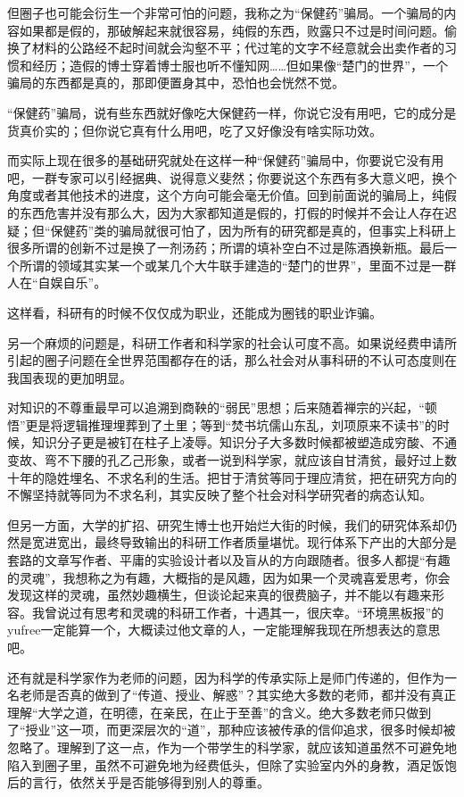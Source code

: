 \documentclass[
]{book}
\begin{document}
但圈子也可能会衍生一个非常可怕的问题，我称之为``保健药''骗局。一个骗局的内容如果都是假的，那破解起来就很容易，纯假的东西，败露只不过是时间问题。偷换了材料的公路经不起时间就会沟壑不平；代过笔的文字不经意就会出卖作者的习惯和经历；造假的博士穿着博士服也听不懂知网\ldots\ldots 但如果像``楚门的世界''，一个骗局的东西都是真的，那即便置身其中，恐怕也会恍然不觉。

``保健药''骗局，说有些东西就好像吃大保健药一样，你说它没有用吧，它的成分是货真价实的；但你说它真有什么用吧，吃了又好像没有啥实际功效。

而实际上现在很多的基础研究就处在这样一种``保健药''骗局中，你要说它没有用吧，一群专家可以引经据典、说得意义斐然；你要说这个东西有多大意义吧，换个角度或者其他技术的进度，这个方向可能会毫无价值。回到前面说的骗局上，纯假的东西危害并没有那么大，因为大家都知道是假的，打假的时候并不会让人存在迟疑；但``保健药''类的骗局就很可怕了，因为所有的研究都是真的，但事实上科研上很多所谓的创新不过是换了一剂汤药；所谓的填补空白不过是陈酒换新瓶。最后一个所谓的领域其实某一个或某几个大牛联手建造的``楚门的世界''，里面不过是一群人在``自娱自乐''。

这样看，科研有的时候不仅仅成为职业，还能成为圈钱的职业诈骗。

另一个麻烦的问题是，科研工作者和科学家的社会认可度不高。如果说经费申请所引起的圈子问题在全世界范围都存在的话，那么社会对从事科研的不认可态度则在我国表现的更加明显。

对知识的不尊重最早可以追溯到商鞅的``弱民''思想；后来随着禅宗的兴起，``顿悟''更是将逻辑推理埋葬到了土里；等到``焚书坑儒山东乱，刘项原来不读书''的时候，知识分子更是被钉在柱子上凌辱。知识分子大多数时候都被塑造成穷酸、不通变故、弯不下腰的孔乙己形象，或者一说到科学家，就应该自甘清贫，最好过上数十年的隐姓埋名、不求名利的生活。把甘于清贫等同于理应清贫，把在研究方向的不懈坚持就等同为不求名利，其实反映了整个社会对科学研究者的病态认知。

但另一方面，大学的扩招、研究生博士也开始烂大街的时候，我们的研究体系却仍然是宽进宽出，最终导致输出的科研工作者质量堪忧。现行体系下产出的大部分是套路的文章写作者、平庸的实验设计者以及盲从的方向跟随者。很多人都提``有趣的灵魂''，我想称之为有趣，大概指的是风趣，因为如果一个灵魂喜爱思考，你会发现这样的灵魂，虽然妙趣横生，但谈论起来真的很费脑子，并不能以有趣来形容。我曾说过有思考和灵魂的科研工作者，十遇其一，很庆幸。``环境黑板报''的yufree一定能算一个，大概读过他文章的人，一定能理解我现在所想表达的意思吧。

还有就是科学家作为老师的问题，因为科学的传承实际上是师门传递的，但作为一名老师是否真的做到了``传道、授业、解惑''？其实绝大多数的老师，都并没有真正理解``大学之道，在明德，在亲民，在止于至善''的含义。绝大多数老师只做到了``授业''这一项，而更深层次的``道''，那种应该被传承的信仰追求，很多时候却被忽略了。理解到了这一点，作为一个带学生的科学家，就应该知道虽然不可避免地陷入到圈子里，虽然不可避免地为经费低头，但除了实验室内外的身教，酒足饭饱后的言行，依然关乎是否能够得到别人的尊重。
\end{document}
